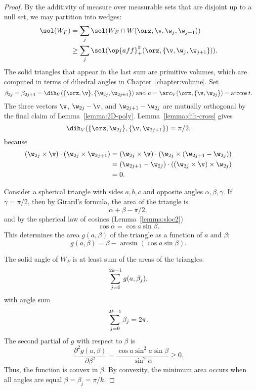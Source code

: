 \begin{cnl}
\begin{proof}
By the additivity of measure over measurable sets that are disjoint up
to a null set, we may partition into wedges:
\begin{align*}
\sol(W_F) &= \sum_j \sol(W_F \cap W(\orz,\v,\w_j,\w_{j+1}))\\
  &\ge \sum_j \sol(\op{aff}_+^0(\orz,\braced{\v,\w_j,\w_{j+1}})).
\end{align*}
The solid triangles that appear in the last sum are primitive volumes,
which are computed in terms of
dihedral angles  in Chapter~\ref{chapter:volume}.  Set
\[
\beta_{2j}=\beta_{2j+1}=\dih_V(\braced{\orz,\v},\braced{\w_{2j},\w_{2j\pm1}}) \text{ and }
a = \arc_V(\orz,\braced{\v,\w_{2j}}) = \arccos t.
\]
The three vectors $\v$, $\w_{2j}-\v$, and $\w_{2j+1}-\w_{2j}$ are
mutually orthogonal by the final claim of Lemma~\ref{lemma:2D-poly}.
Lemma~\ref{lemma:dih-cross} gives
\[
\dih_V(\braced{\orz,\w_{2j}},\braced{\v,\w_{2j+1}}) =\pi/2,
\]
because
\begin{align*}
(\w_{2j} \times \v)\cdot (\w_{2j}\times \w_{2j+1}) &=
(\w_{2j} \times \v)\cdot (\w_{2j}\times (\w_{2j+1}-\w_{2j}))\\
 &=  (\w_{2j+1}-\w_{2j})\cdot ((\w_{2j} \times \v)\times \w_{2j})\\
&= 0.
\end{align*}

Consider a spherical triangle with sides $a,b,c$ and opposite angles
$\alpha,\beta,\gamma$.  If $\gamma=\pi/2$, then by Girard's formula,
the area of the triangle is
\[  
\alpha+\beta-\pi/2,
\] 
and by the spherical law of cosines (Lemma~\ref{lemma:sloc2})
\[  
\cos\alpha =\cos a\sin\beta.
\] 
This determines the area $g(a,\beta)$ of the triangle 
as a function of $a$ and $\beta$:
\[
g(a,\beta) = \beta - \arcsin(\cos a \sin \beta).
\]
%
%
%
%
%
%
%
%

The solid angle of $W_F$ is at least sum of the areas of the triangles:
\[  
{\sum_{j = 0}^{2k-1} {g(a,\beta_j)}},
\] 
with angle sum
\[  
{\sum_{j = 0}^{2k-1} { \beta_j}} = 2\pi.
\] 
The second partial of $g$ with respect to $\beta$ is
\[  
\frac{\partial^2 g(a,\beta)}{\partial \beta^2} = 
\frac{\cos a\sin^2 a\sin \beta}{\sin^2\alpha} \ge 0.
\] 
Thus, the function is convex in $\beta$.  By convexity, the minimum area
occurs when all angles are equal $\beta=\beta_j = \pi/k$.


\end{proof}
\end{cnl}
